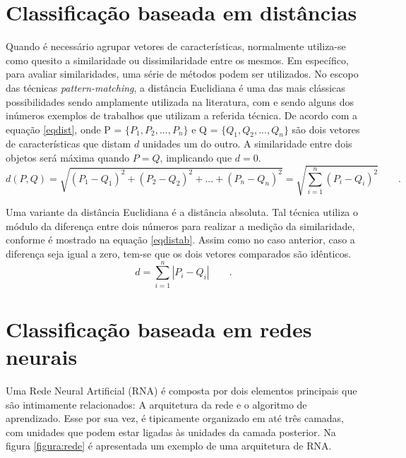 \documentclass[a4paper,12pt,twoside,openright]{report}
\begin{document}
\section{Classifica\c{c}\~{a}o baseada em dist\^{a}ncias}
\label{similaridade_baseada_em_distancias}
\par Quando \'{e} necess\'{a}rio agrupar vetores de caracter\'{i}sticas, normalmente utiliza-se como quesito a similaridade ou dissimilaridade entre os mesmos. Em espec\'{i}fico, para avaliar similaridades, uma s\'{e}rie de m\'{e}todos podem ser utilizados. No escopo das t\'{e}cnicas \textit{pattern-matching}, a dist\^{a}ncia Euclidiana \'{e} uma das mais cl\'{a}ssicas possibilidades sendo amplamente utilizada na literatura, com \cite{Marcel_Kfouri} e \cite{Ana_Paula} sendo alguns dos in\'{u}meros exemplos de trabalhos que utilizam a referida t\'{e}cnica. De acordo com a equa{\c c}\~{a}o \ref{eqdist}, onde P = $\{P_1, P_2, ..., P_n\}$ e Q = $\{Q_1, Q_2, ..., Q_n\}$ s\~{a}o dois vetores de caracter\'{i}sticas que distam $d$ unidades um do outro. A similaridade entre dois objetos ser\'{a} m\'{a}xima quando $P = Q$, implicando que $d=0$.
\begin{equation}
d(P, Q) = \sqrt{(P_1-Q_1)^2 + (P_2-Q_2)^2 + ... + (P_n-Q_n)^2} =\sqrt{\sum_{i = 1}^{n}(P_i-Q_i)^2} \qquad.
\label{eqdist}
\end{equation}
\par Uma variante da dist\^{a}ncia Euclidiana \'{e} a dist\^{a}ncia absoluta. Tal t\'{e}cnica utiliza o m\'{o}dulo da diferen{\c c}a entre dois n\'{u}meros para realizar a medi{\c c}\~{a}o da similaridade, conforme \'{e} mostrado na equa{\c c}\~{a}o \ref{eqdistab}. Assim como no caso anterior, caso a diferen{\c c}a seja igual a zero, tem-se que os dois vetores comparados s\~{a}o id\^{e}nticos.
\begin{equation}
d = \sum_{i = 1}^{n} | P_i-Q_i | \qquad.
\label{eqdistab}
\end{equation}
\section{Classifica\c{c}\~{a}o baseada em redes neurais}
\par Uma Rede Neural Artificial (RNA) \'{e} composta por dois elementos principais que s\~{a}o intimamente relacionados: A arquitetura da rede e o algoritmo de aprendizado. Esse por sua vez, \'{e} tipicamente organizado em at\'{e} tr\^{e}s camadas, com unidades que podem estar ligadas \`{a}s unidades da camada posterior. Na figura \ref{figura:rede} \'{e} apresentada um exemplo de uma arquitetura de RNA. 
\end{document}
